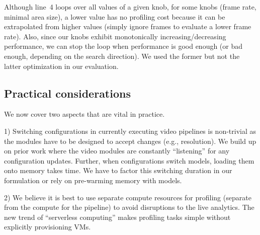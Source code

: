 Although line~4 loops over all values of a given knob, for some knobs (\eg frame rate, minimal area size), a
lower value has no profiling cost because it can be extrapolated from higher values (\eg simply ignore frames to evaluate a lower frame rate). Also, since our knobs exhibit monotonically increasing/decreasing performance, we can stop the loop when performance is good enough (or bad enough, depending on the search direction). We used the former but not the latter optimization in our evaluation.



\subsection{Practical considerations}

We now cover two aspects that are vital in practice. 

1) Switching configurations in currently executing video pipelines is non-trivial as the modules have to be designed to accept changes (e.g., resolution). We build up on prior work \cite{videostar} where the video modules are constantly ``listening'' for any configuration updates. Further, when configurations switch \nn models, loading them onto memory takes time. We have to factor this switching duration in our formulation or rely on pre-warming memory with \nn models. 

2) We believe it is best to use separate compute resources for profiling (separate from the compute for the pipeline) to avoid disruptions to the live analytics. The new trend of ``serverless computing'' \cite{lambda, functions} makes profiling tasks simple without explicitly provisioning VMs. 
